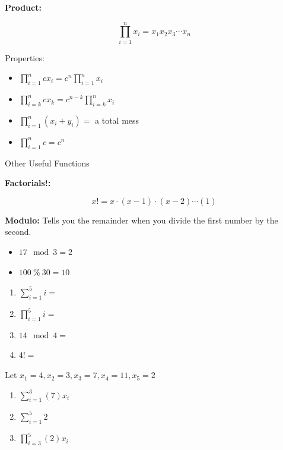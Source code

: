\documentclass[]{book}
\providecommand{\tightlist}{%
  \setlength{\itemsep}{0pt}\setlength{\parskip}{0pt}}
\theoremstyle{definition}
\theoremstyle{definition}
\theoremstyle{definition}
\theoremstyle{remark}
\let\BeginKnitrBlock\begin \let\EndKnitrBlock\end
\begin{document}
\textbf{Product:}

\[\prod\limits_{i=1}^n x_i = x_1 x_2 x_3 \cdots x_n\]

Properties:

\begin{itemize}
\tightlist
\item
  \(\prod\limits_{i=1}^n c x_i = c^n \prod\limits_{i=1}^n x_i\)
\item
  \(\prod\limits_{i=k}^n c x_k = c^{n-k} \prod\limits_{i=k}^n x_i\)
\item
  \(\prod\limits_{i=1}^n (x_i + y_i) =\) a total mess
\item
  \(\prod\limits_{i=1}^n c = c^n\)
\end{itemize}

Other Useful Functions

\textbf{Factorials!:}

\[x! = x\cdot (x-1) \cdot (x-2) \cdots (1)\]

\textbf{Modulo:} Tells you the remainder when you divide the first number by the second.

\begin{itemize}
\tightlist
\item
  \(17 \mod 3 = 2\)
\item
  \(100 \ \% \ 30 = 10\)
\end{itemize}

\BeginKnitrBlock{example}[Operators]
\protect\hypertarget{exm:operators}{}{\label{exm:operators} {} }

\begin{enumerate}
\def\labelenumi{\arabic{enumi}.}
\item
  \(\sum\limits_{i=1}^{5} i =\)
\item
  \(\prod\limits_{i=1}^{5} i =\)
\item
  \(14 \mod 4 =\)
\item
  \(4! =\)
\end{enumerate}
\EndKnitrBlock{example}

\BeginKnitrBlock{exercise}[Operators]
\protect\hypertarget{exr:operators1}{}{\label{exr:operators1} {} }Let \(x_1 = 4, x_2 = 3, x_3 = 7, x_4 = 11, x_5 = 2\)

\begin{enumerate}
\def\labelenumi{\arabic{enumi}.}
\item
  \(\sum\limits_{i=1}^{3} (7)x_i\)
\item
  \(\sum\limits_{i=1}^{5} 2\)
\item
  \(\prod\limits_{i=3}^{5} (2)x_i\)
\end{enumerate}
\EndKnitrBlock{exercise}
\end{document}
